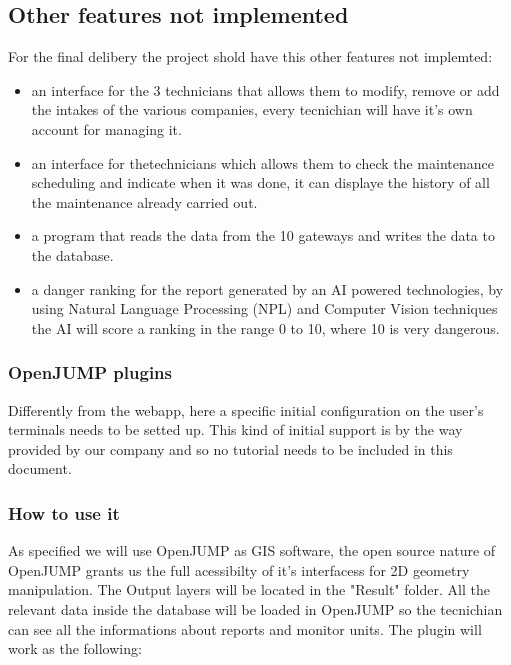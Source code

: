 \subsection{Other features not implemented}

For the final delibery the project shold have this other features not implemted:

\begin{itemize}
    \item an interface for the 3 technicians that allows them to modify, remove or add the intakes of the various companies, every tecnichian will have it's own account for managing it.
    \item an interface for thetechnicians which allows them to check the maintenance scheduling and indicate when it was done, it can displaye the history of all the maintenance already carried out.
    \item a program that reads the data from the 10 gateways and writes the data to the database.
    \item a danger ranking for the report generated by an AI powered technologies, by using Natural Language Processing (NPL) and Computer Vision techniques the AI will score a ranking in the range 0 to 10, where 10 is very dangerous.
\end{itemize}

\subsubsection{OpenJUMP plugins}
Differently from the webapp, here a specific initial configuration on the user's terminals needs to be setted up.
This kind of initial support is by the way provided by our company and so no tutorial needs to be included in this document.

\subsubsection{How to use it}

As specified we will use OpenJUMP as GIS software, the open source nature of OpenJUMP grants us the full acessibilty of it's interfacess for 2D geometry manipulation.
The Output layers will be located in the "Result" folder. All the relevant data inside the database will be loaded in OpenJUMP so the tecnichian can see all the informations about reports and monitor units.
The plugin will work as the following:

